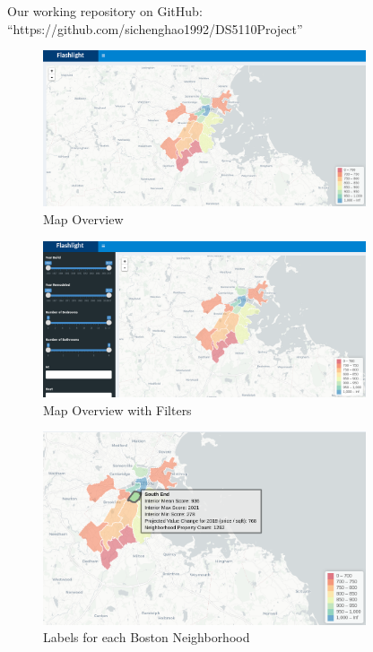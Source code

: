 \documentclass[12pt]{article}
\begin{document}
Our working repository on GitHub: 
``https://github.com/sichenghao1992/DS5110Project''


\begin{figure}
  \caption{Map Overview}
  \centering
  \includegraphics[width=0.85\textwidth]{map_overview}
\end{figure}

\begin{figure}
  \caption{Map Overview with Filters}
  \centering
  \includegraphics[width=0.85\textwidth]{map_filter_overview}
\end{figure}

\begin{figure}
  \caption{Labels for each Boston Neighborhood}
  \centering
  \includegraphics[width=0.85\textwidth]{region_label}
\end{figure}
\end{document}
